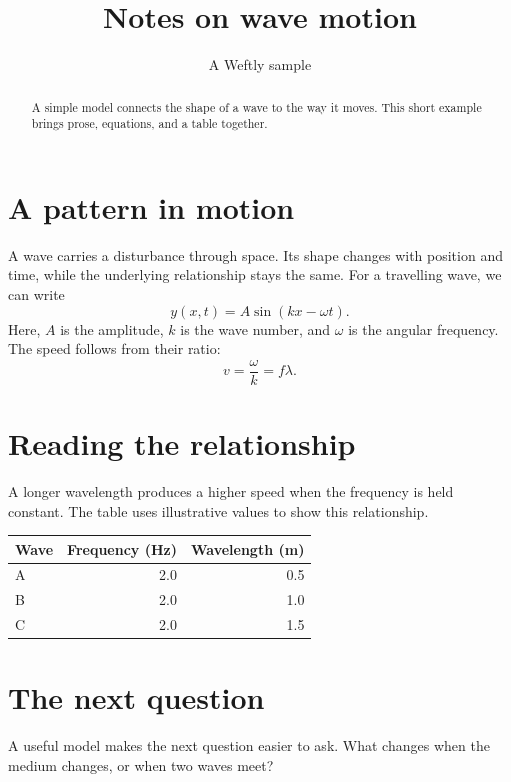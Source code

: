 \documentclass[11pt]{article}
\title{Notes on wave motion}
\author{A Weftly sample}
\date{}
\begin{document}
\maketitle
\begin{abstract}
A simple model connects the shape of a wave to the way it moves.
This short example brings prose, equations, and a table together.
\end{abstract}
\section{A pattern in motion}
A wave carries a disturbance through space. Its shape changes with
position and time, while the underlying relationship stays the same.
For a travelling wave, we can write
\begin{equation}
  y(x,t)=A\sin(kx-\omega t).
\end{equation}
Here, $A$ is the amplitude, $k$ is the wave number, and $\omega$ is
the angular frequency. The speed follows from their ratio:
\[
  v=\frac{\omega}{k}=f\lambda.
\]
\section{Reading the relationship}
A longer wavelength produces a higher speed when the frequency is
held constant. The table uses illustrative values to show this
relationship.
\begin{center}
\begin{tabular}{lrr}
\toprule
Wave & Frequency (Hz) & Wavelength (m) \\
\midrule
A & 2.0 & 0.5 \\
B & 2.0 & 1.0 \\
C & 2.0 & 1.5 \\
\bottomrule
\end{tabular}
\end{center}
\section{The next question}
A useful model makes the next question easier to ask. What changes
when the medium changes, or when two waves meet?
\end{document}
